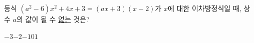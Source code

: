 등식 $(a^2-6)x^2+4x+3=(ax+3)(x-2)$가 $x$에 대한 이차방정식일 때, 상수 $a$의 값이 될 수 \underline{없는} 것은?
\begin{choices32}{$-3$}{$-2$}{$-1$}{$0$}{$1$}\end{choices32}
